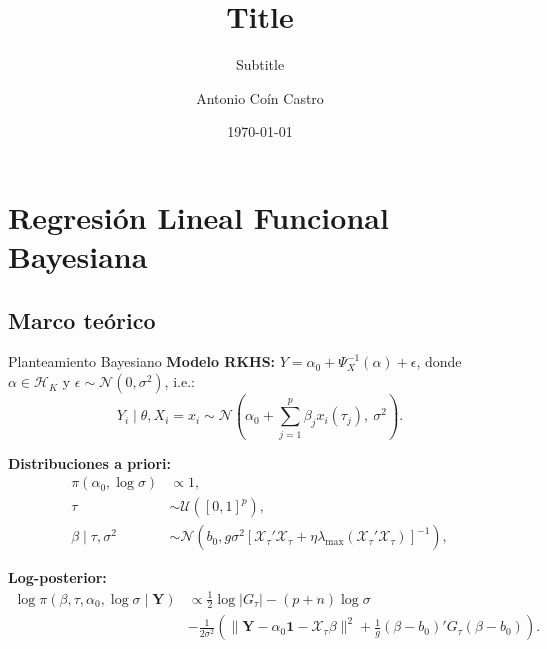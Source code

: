 \documentclass[10pt, spanish, professionalfonts]{beamer}
\title{Title}
\subtitle{Subtitle}
\date{\today}
\author{Antonio Coín Castro}
\institute{Institute}
\begin{document}

\section{Regresión Lineal Funcional Bayesiana}

\subsection{Marco teórico}

\begin{frame}{Planteamiento Bayesiano}
  \textbf{Modelo RKHS:} \(Y = \alpha_0 + \Psi_{X}^{-1}(\alpha) + \epsilon\), donde \(\alpha\in \mathcal H_K\) y \(\epsilon \sim \mathcal N(0, \sigma^2)\), i.e.:
  \[
    Y_i\mid \theta, X_i=x_i \sim \mathcal N\left(\alpha_0 + \sum_{j=1}^p \beta_jx_i(\tau_j), \ \sigma^2\right).
  \]

\textbf{Distribuciones a priori:}
\begin{align*}
  \pi(\alpha_0, \log \sigma)              & \propto 1,                                                     \\
  \tau                     & \sim \mathcal U([0, 1]^p),                                              \\
  \beta\mid \tau, \sigma^2 & \sim \mathcal N\left(b_0, g\sigma^2\left[\mathcal X_\tau' \mathcal X_\tau + \eta \lambda_{\text{max}}(\mathcal X_\tau' \mathcal X_\tau)\right]^{-1}\right),
\end{align*}

\textbf{Log-posterior:}
\begin{align*}
  \log \pi(\beta, \tau, \alpha_0, \log\sigma\mid \boldsymbol{Y}) &\propto \frac{1}{2}\log |G_\tau| - (p+n)\log \sigma\\
  &-\frac{1}{2\sigma^2} \left(\|\boldsymbol{Y}-\alpha_0\boldsymbol{1} - \mathcal X_\tau\beta\|^2 + \frac{1}{g}(\beta - b_0)'G_\tau(\beta - b_0) \right).
\end{align*}
\end{frame}
\end{document}
